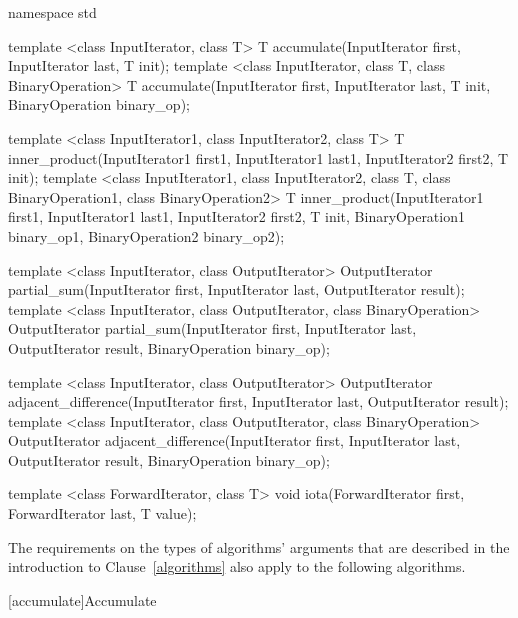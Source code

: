 %
\begin{codeblock}
namespace std {
  template <class InputIterator, class T>
    T accumulate(InputIterator first, InputIterator last, T init);
  template <class InputIterator, class T, class BinaryOperation>
    T accumulate(InputIterator first, InputIterator last, T init,
                 BinaryOperation binary_op);

  template <class InputIterator1, class InputIterator2, class T>
    T inner_product(InputIterator1 first1, InputIterator1 last1,
                    InputIterator2 first2, T init);
  template <class InputIterator1, class InputIterator2, class T,
            class BinaryOperation1, class BinaryOperation2>
    T inner_product(InputIterator1 first1, InputIterator1 last1,
                    InputIterator2 first2, T init,
                    BinaryOperation1 binary_op1,
                    BinaryOperation2 binary_op2);

  template <class InputIterator, class OutputIterator>
    OutputIterator partial_sum(InputIterator first,
                               InputIterator last,
                               OutputIterator result);
  template <class InputIterator, class OutputIterator,
            class BinaryOperation>
    OutputIterator partial_sum(InputIterator first,
                               InputIterator last,
                               OutputIterator result,
                               BinaryOperation binary_op);

  template <class InputIterator, class OutputIterator>
    OutputIterator adjacent_difference(InputIterator first,
                                       InputIterator last,
                                       OutputIterator result);
  template <class InputIterator, class OutputIterator,
            class BinaryOperation>
    OutputIterator adjacent_difference(InputIterator first,
                                       InputIterator last,
                                       OutputIterator result,
                                       BinaryOperation binary_op);

  template <class ForwardIterator, class T>
    void iota(ForwardIterator first, ForwardIterator last, T value);
}
\end{codeblock}

\pnum
The requirements on the types of algorithms' arguments that are
described in the introduction to Clause~\ref{algorithms} also
apply to the following algorithms.

[accumulate]{Accumulate}


